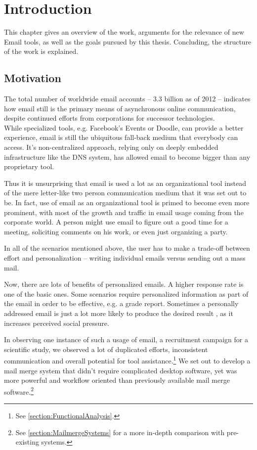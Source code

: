 \chapter{Introduction}
\label{chapter:Introduction}

This chapter gives an overview of the work, arguments for the relevance of new Email tools, as well as the goals pursued by this thesis. Concluding, the structure of the work is explained.

\section{Motivation}

The total number of worldwide email accounts -- 3.3 billion as of 2012 \citep{emailreport} -- indicates how email still is the primary means of asynchronous online communication, despite continued efforts from corporations for successor technologies. \\
While specialized tools, e.g. Facebook's Events or Doodle, can provide a better experience, email is still the ubiquitous fall-back medium that everybody can access. It's non-centralized approach, relying only on deeply embedded infrastructure like the DNS system, has allowed email to become bigger than any proprietary tool.

Thus it is unsurprising that email is used a lot as an organizational tool instead of the mere letter-like two person communication medium that it was set out to be. In fact, use of email as an organizational tool is primed to become even more prominent, with most of the growth and traffic in email usage coming from the corporate world. \citep[p. 3]{emailreport} A person might use email to figure out a good time for a meeting, soliciting comments on his work, or even just organizing a party.

In all of the scenarios mentioned above, the user has to make a trade-off between effort and personalization -- writing individual emails versus sending out a mass mail.

Now, there are lots of benefits of personalized emails. A higher response rate is one of the basic ones. Some scenarios require personalized information as part of the email in order to be effective, e.g. a grade report. Sometimes a personally addressed email is just a lot more likely to produce the desired result \citep[p. 1375, 1380]{Joinson2007}, as it increases perceived social pressure.

In observing one instance of such a usage of email, a recruitment campaign for a scientific study, we observed a lot of duplicated efforts, inconsistent communication and overall potential for tool assistance.\footnote{See \autoref{section:FunctionalAnalysis}.} We set out to develop a mail merge system that didn't require complicated desktop software, yet was more powerful and workflow oriented than previously available mail merge software.\footnote{See \autoref{section:MailmergeSystems} for a more in-depth comparison with pre-existing systems.}

